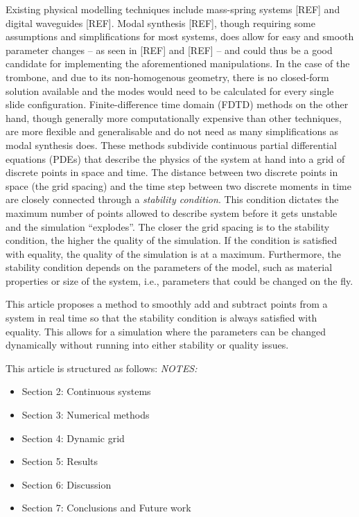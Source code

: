 \documentclass[dvipsnames, reprint]{JASA}
\def\SWcomment[#1]{\textcolor{Bittersweet}{#1}}
\begin{document}
Existing physical modelling techniques include mass-spring systems [REF] and digital waveguides [REF]. Modal synthesis [REF], though requiring some assumptions and simplifications for most systems, does allow for easy and smooth parameter changes -- as seen in [REF] and [REF] -- and could thus be a good candidate for implementing the aforementioned manipulations. \SWcomment[In the case of the trombone, and due to its non-homogenous geometry, there is no closed-form solution available and the modes would need to be calculated for every single slide configuration.] Finite-difference time domain (FDTD) methods on the other hand, though generally more computationally expensive than other techniques, are more flexible and generalisable and do not need as many simplifications as modal synthesis does. These methods subdivide continuous partial differential equations (PDEs) that describe the physics of the system at hand into a grid of discrete points in space and time. 
%
%
The distance between two discrete points in space (the grid spacing) and the time step between two discrete moments in time are closely connected through a \textit{stability condition}. This condition dictates the maximum number of points allowed to describe system before it gets unstable and the simulation ``explodes''. The closer the grid spacing is to the stability condition, the higher the quality of the simulation. If the condition is satisfied with equality, the quality of the simulation is at a maximum. 
Furthermore, the stability condition depends on the parameters of the model, such as material properties or size of the system, i.e., parameters that could be changed on the fly.

This article proposes a method to smoothly add and subtract points from a system in real time so that the stability condition is always satisfied with equality. This allows for a simulation where the parameters can be changed dynamically without running into either stability or quality issues. 

This article is structured as follows: 
\textit{NOTES:}
\begin{itemize}
\item Section 2: Continuous systems
\item Section 3: Numerical methods
\item Section 4: Dynamic grid
\item Section 5: Results
\item Section 6: Discussion
\item Section 7: Conclusions and Future work
\end{itemize}
\end{document}
